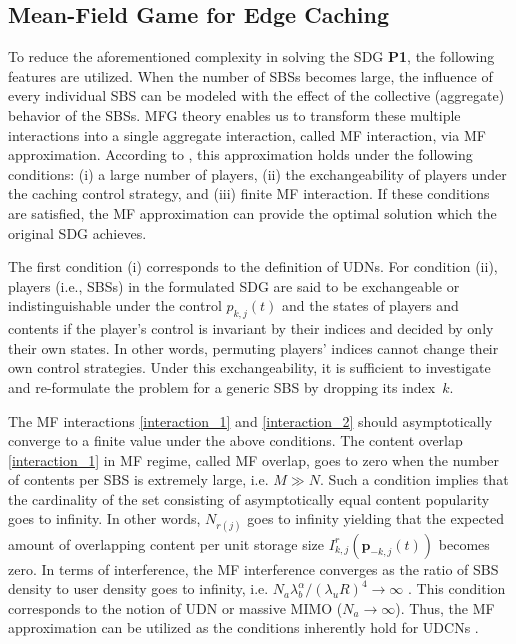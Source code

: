 \documentclass{book}
\begin{document}
    \subsection{Mean-Field Game for Edge Caching} \label{Mean-field Game for Caching}


    To reduce the aforementioned complexity in solving the SDG \textbf{P1}, the following features are utilized.
    When the number of SBSs becomes large, the influence of every individual SBS can be modeled with the effect of the collective (aggregate) behavior of the SBSs. 
    {MFG theory enables us to transform these multiple interactions into a single aggregate interaction, called MF interaction, via MF approximation. 
    According to \cite{MF_ref2}, this approximation holds under the following conditions: 
    (i) a large number of players, (ii) the exchangeability of players under the caching control strategy, and (iii) finite MF interaction. If these conditions are satisfied, the MF approximation can provide the optimal solution which the original SDG achieves.}
    
    The first condition (i) corresponds to the definition of UDNs. For condition (ii),
    players (i.e., SBSs) in the formulated SDG are said to be exchangeable or indistinguishable under the control ${p}_{k,j}(t)$ and the states of players and contents 
    if the player's control is invariant by their indices and decided by only their own states.
    In other words, permuting players' indices cannot change their own control strategies. Under this exchangeability, it is sufficient to investigate and re-formulate the problem for a generic SBS by dropping its index~$k$. 
    
    The MF interactions \eqref{interaction_1} and \eqref{interaction_2} should asymptotically converge to a finite value under the above conditions.
    The content overlap \eqref{interaction_1} in MF regime, called MF overlap, goes to zero when the number of contents per SBS is extremely large, i.e. $M \gg N $. Such a condition implies that the cardinality of the set consisting of asymptotically equal content popularity goes to infinity. In other words, $N_{r(j)}$ goes to infinity yielding that the expected amount of overlapping content per unit storage size $I^r_{k,j}(\boldsymbol{p}_{-k,j}(t))$ becomes zero. 
    In terms of interference, the MF interference converges  as
    the ratio of SBS density to user density goes to infinity, i.e.  $N_a\lambda_b^{\alpha}/(\lambda_u R)^4 \rightarrow \infty$ \cite{JHP1}. This condition corresponds to the notion of UDN  \cite{interf_udn} or massive MIMO ($N_a \rightarrow \infty$). Thus, the MF approximation can be utilized as the conditions inherently hold for UDCNs .
    
\end{document}
